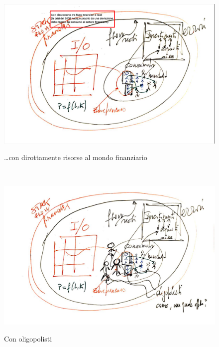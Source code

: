\documentclass[9pt]{beamer}
\begin{document}
\begin{frame}{~} %



\begin{figure}[H]
\center
\includegraphics[scale=0.15]{4b.png}
\label{4b}
\caption{\ldots con dirottamente risorse al mondo finanziario}
\end{figure}

\end{frame}

\begin{frame}{~} %



\begin{figure}[H]
\center
\includegraphics[scale=0.50]{5.pdf}
\label{5}
\caption{Con oligopolisti}
\end{figure}

\end{frame}
\end{document}
